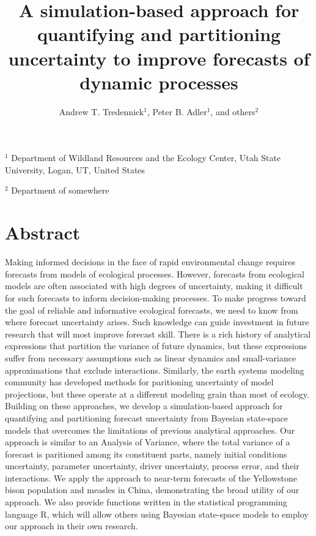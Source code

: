 \documentclass[12pt,]{article}
\title{A simulation-based approach for quantifying and partitioning uncertainty
to improve forecasts of dynamic processes}
\author{Andrew T. Tredennick\(^{1}\), Peter B. Adler\(^1\), and others\(^{2}\)}
\date{}
\begin{document}
\maketitle

\newcommand{\smalltodo}[2][]
    {\todo[caption={#2}, #1]
    {\begin{spacing}{0.5}#2\end{spacing}}}\setlength{\abovedisplayskip}{0pt}\raggedright\setlength{\parindent}{36pt}

\noindent{}\(^1\) Department of Wildland Resources and the Ecology
Center, Utah State University, Logan, UT, United States

\noindent{}\(^2\) Department of somewhere

\hypertarget{abstract}{%
\section{Abstract}\label{abstract}}

Making informed decisions in the face of rapid environmental change
requires forecasts from models of ecological processes. However,
forecasts from ecological models are often associated with high degrees
of uncertainty, making it difficult for such forecasts to inform
decision-making processes. To make progress toward the goal of reliable
and informative ecological forecasts, we need to know from where
forecast uncertainty arises. Such knowledge can guide investment in
future research that will most improve forecast skill. There is a rich
history of analytical expressions that partition the variance of future
dynamics, but these expressions suffer from necessary assumptions such
as linear dynamics and small-variance approximations that exclude
interactions. Similarly, the earth systems modeling community has
developed methods for paritioning uncertainty of model projections, but
these operate at a different modeling grain than most of ecology.
Building on these approaches, we develop a simulation-based approach for
quantifying and partitioning forecast uncertainty from Bayesian
state-space models that overcomes the limitations of previous analytical
approaches. Our approach is similar to an Analysis of Variance, where
the total variance of a forecast is paritioned among its constituent
parts, namely initial conditions uncertainty, parameter uncertainty,
driver uncertainty, process error, and their interactions. We apply the
approach to near-term forecasts of the Yellowstone bison population and
measles in China, demonstrating the broad utility of our approach. We
also provide functions written in the statistical programming language
R, which will allow others using Bayesian state-space models to employ
our approach in their own research.
\end{document}
